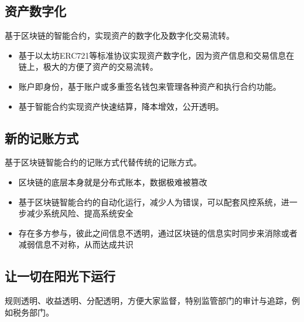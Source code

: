 \documentclass[UTF9]{ctexart}
\begin{document}
\subsection{资产数字化}

基于区块链的智能合约，实现资产的数字化及数字化交易流转。

\begin{itemize}
\item 基于以太坊ERC721等标准协议实现资产数字化，因为资产信息和交易信息在链上，极大的方便了资产的交易流转。

\item 账户即身份，基于账户或多重签名钱包来管理各种资产和执行合约功能。

\item 基于智能合约实现资产快速结算，降本增效，公开透明。

\end{itemize}

\subsection{新的记账方式}

基于区块链智能合约的记账方式代替传统的记账方式。

\begin{itemize}
\item 区块链的底层本身就是分布式账本，数据极难被篡改

\item 基于区块链智能合约的自动化运行，减少人为错误，可以配套风控系统，进一步减少系统风险、提高系统安全

\item 存在多方参与，彼此之间信息不透明，通过区块链的信息实时同步来消除或者减弱信息不对称，从而达成共识

\end{itemize}

\subsection{让一切在阳光下运行}

规则透明、收益透明、分配透明，方便大家监督，特别监管部门的审计与追踪，例如税务部门。
\end{document}
